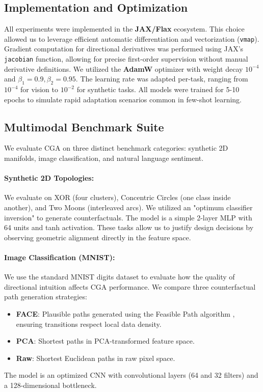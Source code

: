 \documentclass[sigconf,anonymous]{aamas}
\begin{document}
\subsection{Implementation and Optimization}
All experiments were implemented in the \textbf{JAX/Flax} ecosystem. This choice allowed us to leverage efficient automatic differentiation and vectorization (\texttt{vmap}). Gradient computation for directional derivatives was performed using JAX's \texttt{jacobian} function, allowing for precise first-order supervision without manual derivative definitions. We utilized the \textbf{AdamW} optimizer with weight decay $10^{-4}$ and $\beta_1=0.9, \beta_2=0.95$. The learning rate was adapted per-task, ranging from $10^{-4}$ for vision to $10^{-2}$ for synthetic tasks. All models were trained for 5-10 epochs to simulate rapid adaptation scenarios common in few-shot learning.

\subsection{Multimodal Benchmark Suite}
We evaluate CGA on three distinct benchmark categories: synthetic 2D manifolds, image classification, and natural language sentiment.

\paragraph{Synthetic 2D Topologies:}
We evaluate on XOR (four clusters), Concentric Circles (one class inside another), and Two Moons (interleaved arcs). We utilized an "optimum classifier inversion" to generate counterfactuals. The model is a simple 2-layer MLP with 64 units and tanh activation. These tasks allow us to justify design decisions by observing geometric alignment directly in the feature space.

\paragraph{Image Classification (MNIST):}
We use the standard MNIST digits dataset to evaluate how the quality of directional intuition affects CGA performance. We compare three counterfactual path generation strategies:
\begin{itemize}
    \item \textbf{FACE}: Plausible paths generated using the Feasible Path algorithm \cite{poyiadzi2020face}, ensuring transitions respect local data density.
    \item \textbf{PCA}: Shortest paths in PCA-transformed feature space.
    \item \textbf{Raw}: Shortest Euclidean paths in raw pixel space.
\end{itemize}
The model is an optimized CNN with convolutional layers (64 and 32 filters) and a 128-dimensional bottleneck.
\end{document}
